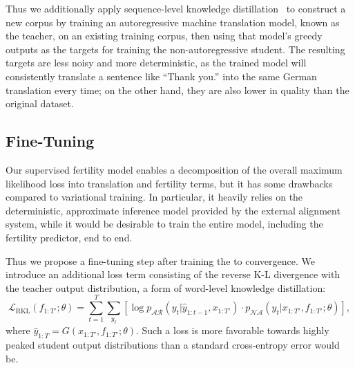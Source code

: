 \documentclass{article} %
\begin{document}
Thus we additionally apply sequence-level knowledge distillation~\citep{kim2016sequence} to construct a new corpus by training an autoregressive machine translation model, known as the teacher, on an existing training corpus, then using that model's greedy outputs as the targets for training the non-autoregressive student. The resulting targets are less noisy and more deterministic, as the trained model will consistently translate a sentence like ``Thank you.'' into the same German translation every time; on the other hand, they are also lower in quality than the original dataset.


\subsection{Fine-Tuning}
Our supervised fertility model enables a decomposition of the overall maximum likelihood loss into translation and fertility terms, but it has some drawbacks compared to variational training.
In particular, it heavily relies on the deterministic, approximate inference model provided by the external alignment system, while it would be desirable to train the entire model, including the fertility predictor, end to end.

Thus we propose a fine-tuning step after training the \model{} to convergence. We introduce an additional loss term consisting of the reverse K-L divergence with the teacher output distribution, a form of word-level knowledge distillation:
\begin{equation}
\mathcal{L}_\text{RKL}\left(f_{1:T'}; \theta \right)=  \sum_{t=1}^T\sum_{y_t}\left[\log p_{\mathcal{AR}}\left(y_t|\hat{y}_{1:t-1}, x_{1:T'}\right)\cdot p_{\mathcal{NA}}\left(y_t|x_{1:T'}, f_{1:T'}; \theta \right)\right],
\label{eq.soft-conceptual}
\end{equation}
where $\hat{y}_{1:T}=G(x_{1:T'}, f_{1:T'};\theta)$. Such a loss is more favorable towards highly peaked student output distributions than a standard cross-entropy error would be.
\end{document}
